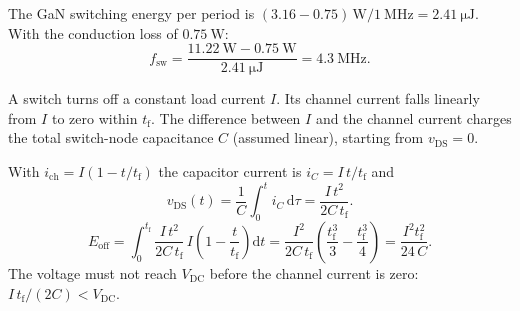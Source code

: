 
\begin{solutionblock}
	The GaN switching energy per period is $(3.16-0.75)\,\si{\watt}/\SI{1}{\mega\hertz}=\SI{2.41}{\micro\joule}$. With the conduction loss of $\SI{0.75}{\watt}$:
	\begin{equation}
		f_\mathrm{sw} = \frac{\SI{11.22}{\watt}-\SI{0.75}{\watt}}{\SI{2.41}{\micro\joule}} = \SI{4.3}{\mega\hertz}.
	\end{equation}
\end{solutionblock}



A switch turns off a constant load current $I$. Its channel current falls linearly from $I$ to zero within $t_\mathrm{f}$. The difference between $I$ and the channel current charges the total switch-node capacitance $C$ (assumed linear), starting from $v_\mathrm{DS}=0$.


\begin{solutionblock}
	With $i_\mathrm{ch}=I(1-t/t_\mathrm{f})$ the capacitor current is $i_C=I\,t/t_\mathrm{f}$ and
	\begin{equation}
		v_\mathrm{DS}(t) = \frac{1}{C}\int_0^t i_C\,\mathrm{d}\tau = \frac{I\,t^2}{2C\,t_\mathrm{f}}.
	\end{equation}
	\begin{equation}
		E_\mathrm{off} = \int_0^{t_\mathrm{f}} \frac{I\,t^2}{2C\,t_\mathrm{f}}\,I\left(1-\frac{t}{t_\mathrm{f}}\right)\mathrm{d}t
		= \frac{I^2}{2C\,t_\mathrm{f}}\left(\frac{t_\mathrm{f}^3}{3}-\frac{t_\mathrm{f}^3}{4}\right) = \frac{I^2t_\mathrm{f}^2}{24\,C}.
	\end{equation}
	The voltage must not reach $V_\mathrm{DC}$ before the channel current is zero: $I\,t_\mathrm{f}/(2C)<V_\mathrm{DC}$.
\end{solutionblock}


